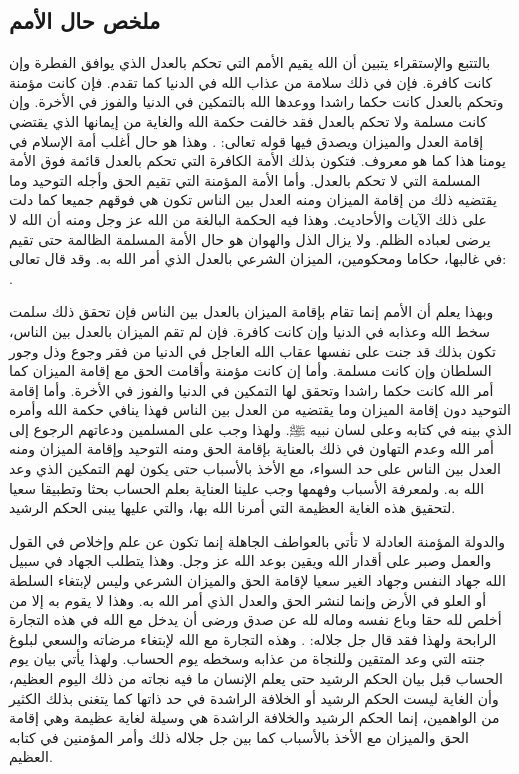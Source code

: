 \subsection{ملخص حال الأمم}

بالتتبع والإستقراء يتبين أن الله يقيم الأمم التي تحكم بالعدل الذي يوافق الفطرة وإن كانت كافرة. فإن في ذلك سلامة من عذاب الله في الدنيا كما تقدم. فإن كانت مؤمنة وتحكم بالعدل كانت حكما راشدا ووعدها الله بالتمكين في الدنيا والفوز في الأخرة. وإن كانت مسلمة ولا تحكم بالعدل فقد خالفت حكمة الله والغاية من إيمانها الذي يقتضي إقامة العدل والميزان ويصدق فيها قوله تعالى:
\quranayah*[49][14]{\footnotesize \surahname*[49]}. وهذا هو حال أغلب أمة الإسلام في يومنا هذا كما هو معروف. فتكون بذلك الأمة الكافرة التي تحكم بالعدل قائمة فوق الأمة المسلمة التي لا تحكم بالعدل. وأما الأمة المؤمنة التي تقيم الحق وأجله التوحيد وما يقتضيه ذلك من إقامة الميزان ومنه العدل بين الناس تكون هي فوقهم جميعا كما دلت على ذلك الآيات والأحاديث. وهذا فيه الحكمة البالغة من الله عز وجل ومنه أن الله لا يرضى لعباده الظلم. ولا يزال الذل والهوان هو حال الأمة المسلمة الظالمة حتى تقيم في غالبها، حكاما ومحكومين، الميزان الشرعي بالعدل الذي أمر الله به. وقد قال تعالى:
\quranayah*[13][11][12]{\footnotesize \surahname*[13]}.

وبهذا يعلم أن الأمم إنما تقام بإقامة الميزان بالعدل بين الناس فإن تحقق ذلك سلمت سخط الله وعذابه في الدنيا وإن كانت كافرة. فإن لم تقم الميزان بالعدل بين الناس، تكون بذلك قد جنت على نفسها عقاب الله العاجل في الدنيا من فقر وجوع وذل وجور السلطان وإن كانت مسلمة. وأما إن كانت مؤمنة وأقامت الحق مع إقامة الميزان كما أمر الله كانت حكما راشدا وتحقق لها التمكين في الدنيا والفوز في الأخرة. وأما إقامة التوحيد دون إقامة الميزان وما يقتضيه من العدل بين الناس فهذا ينافي حكمة الله وأمره الذي بينه في كتابه وعلى لسان نبيه ﷺ. ولهذا وجب على المسلمين ودعاتهم الرجوع إلى أمر الله وعدم التهاون في ذلك بالعناية بإقامة الحق ومنه التوحيد وإقامة الميزان ومنه العدل بين الناس على حد السواء، مع الأخذ بالأسباب حتى يكون لهم التمكين الذي وعد الله به. ولمعرفة الأسباب وفهمها وجب علينا العناية بعلم الحساب بحثا وتطبيقا سعيا لتحقيق هذه الغاية العظيمة التي أمرنا الله بها، والتي عليها يبنى الحكم الرشيد.

والدولة المؤمنة العادلة لا تأتي بالعواطف الجاهلة إنما تكون عن علم وإخلاص في القول والعمل وصبر على أقدار الله ويقين بوعد الله عز وجل. وهذا يتطلب الجهاد في سبيل الله جهاد النفس وجهاد الغير سعيا لإقامة الحق والميزان الشرعي وليس لإبتغاء السلطة أو العلو في الأرض وإنما لنشر الحق والعدل الذي أمر الله به. وهذا لا يقوم به إلا من أخلص لله حقا وباع نفسه وماله لله عن صدق ورضى أن يدخل مع الله في هذه التجارة الرابحة ولهذا فقد قال جل جلاله: \quranayah*[9][111]{\footnotesize \surahname*[9]}. وهذه التجارة مع الله لإبتغاء مرضاته والسعي لبلوغ جنته التي وعد المتقين وللنجاة من عذابه وسخطه يوم الحساب. ولهذا يأتي بيان يوم الحساب قبل بيان الحكم الرشيد حتى يعلم الإنسان ما فيه نجاته من ذلك اليوم العظيم، وأن الغاية ليست الحكم الرشيد أو الخلافة الراشدة في حد ذاتها كما يتغنى بذلك الكثير من الواهمين، إنما الحكم الرشيد والخلافة الراشدة هي وسيلة لغاية عظيمة وهي إقامة الحق والميزان مع الأخذ بالأسباب كما بين جل جلاله ذلك وأمر المؤمنين في كتابه العظيم.



